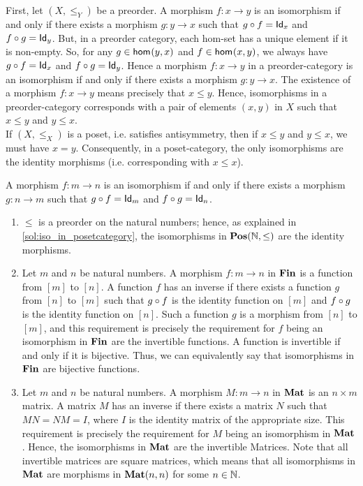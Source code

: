 \begin{solution}\label{sol:iso_in_posetcategory}
First, let $(X,\leq_Y)$ be a preorder. A morphism $f:x\to y$ is an isomorphism if and only if there exists a morphism $g: y\to x$ such that $\co{f}{g}=\Id[x]$ and $\co{g}{f}=\Id[y]$. But, in a preorder category, each hom-set has a unique element if it is non-empty. So, for any $g\in \Hom{y}{x}$ and $f\in \Hom{x}{y}$, we always have $\co{f}{g}=\Id[x]$ and $\co{g}{f}=\Id[y]$. Hence a morphism $f:x\to y$ in a preorder-category is an isomorphism if and only if there exists a morphism $g:y\to x$. The existence of a morphism $f:x\to y$ means precisely that $x\leq y$. Hence, isomorphisms in a preorder-category corresponds with a pair of elements $(x,y)$ in $X$ such that $x\leq y$ and $y\leq x$.\\
If $(X,\leq_X)$ is a poset, i.e. satisfies antisymmetry, then if $x\leq y$ and $y\leq x$, we must have $x=y$. Consequently, in a poset-category, the only isomorphisms are the identity morphisms (i.e. corresponding with $x\leq x$).
\end{solution}

\begin{solution}\label{sol:iso_in_cats_of_nats}
	A morphism $f:m\to n$ is an isomorphism if and only if there exists a morphism $g: n\to m$ such that $\co{f}{g}=\Id[m]$ and $\co{g}{f}=\Id[n]$.
	\begin{enumerate}
		\item $\leq$ is a preorder on the natural numbers; hence, as explained in \cref{sol:iso_in_posetcategory}, the isomorphisms in $\POS(\NN,\leq)$ are the identity morphisms.
		\item Let $m$ and $n$ be natural numbers. A morphism $f : m \to n$ in $\SKELFINSET$ is a function from $[m]$ to $[n]$. A function $f$ has an inverse if there exists a function $g$ from $[n]$ to $[m]$ such that $\co{f}{g}$ is the identity function on $[m]$ and $\co{g}{f}$ is the identity function on $[n]$.		
		Such a function $g$ is a morphism from $[n]$ to $[m]$, and this requirement is precisely the requirement for $f$ being an isomorphism in $\SKELFINSET$ are the invertible functions. A function is invertible if and only if it is bijective.
		Thus, we can equivalently say that isomorphisms in $\SKELFINSET$ are bijective functions. 
		\item  Let $m$ and $n$ be natural numbers.
		A morphism $M : m \to n$ in $\MAT$ is an $n \times m$ matrix. A matrix $M$ has an inverse if there exists a matrix $N$ such that $MN = NM = I$, where $I$ is the identity matrix of the appropriate size.
		This requirement is precisely the requirement for $M$ being an isomorphism in $\MAT$. Hence, the isomorphisms in $\MAT$ are the invertible Matrices.
		Note that all invertible matrices are square matrices, which means that all isomorphisms in $\MAT$ are morphisms in $\MAT(n,n)$ for some $n \in \NN$.
	\end{enumerate}
\end{solution}


